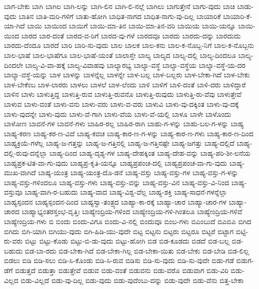 {ಬಾಗ-ಬೇಕು
ಬಾಗಿ
ಬಾಗಿಲ
ಬಾಗಿ-ಲನ್ನು
ಬಾಗಿ-ಲಿನ
ಬಾಗಿ-ಲಿ-ನಲ್ಲೆ
ಬಾಗಿಲು
ಬಾಗುತ್ತೇನೆ
ಬಾಗು-ವುದು
ಬಾಚಿ
ಬಾಡು-ವುದು
ಬಾತಿನ
ಬಾತಿ-ಮರಿ-ಗಳಿಗೆ
ಬಾತು-ಹೋಗಿ
ಬಾಧಿತ-ನಾಗದ
ಬಾಧಿತ-ನಾಗು-ವು-ದಿಲ್ಲ
ಬಾಯಾರಿಕೆ
ಬಾಯಾರಿ-ಕೆ-ಯಾ-ಗಿದೆ
ಬಾಯಿ
ಬಾಯಿಂದ
ಬಾಯಿಗೆ
ಬಾಯಿ-ಮಾ-ತಿನ
ಬಾಯಿ-ಮಾ-ತಿನ-ವರಿ
ಬಾಯಿಯ
ಬಾಯಿ-ಯನ್ನೂ
ಬಾಯಿ-ಯಿಂದ
ಬಾರದ
ಬಾರ-ದಂತೆ
ಬಾರದ-ವ-ರಿಗೆ
ಬಾರದ-ವು-ಗಳೆ
ಬಾರದವೂ
ಬಾರದು
ಬಾರದು-ದನ್ನು
ಬಾರದುದು
ಬಾರದು-ದೆಂದೂ
ಬಾರದೆ
ಬಾರಿ
ಬಾರಿ-ಸು-ವುದು
ಬಾಲ
ಬಾಲಕ
ಬಾಲ-ಕನು
ಬಾಲ-ಕ-ನೊಬ್ಬ-ನಿಗೆ
ಬಾಲ-ಕ-ನೊಬ್ಬನು
ಬಾಲ-ಭಾಷೆ
ಬಾಲ-ಭಾಷೆಗೂ
ಬಾಲ-ಭಾಷೆ-ಯಂತೆ
ಬಾಲಾಸ್ತೇ
ಬಾಲ್ಯ
ಬಾಲ್ಯದ
ಬಾಲ್ಯ-ದಲ್ಲಿ
ಬಾಲ್ಯ-ದಿಂದಲೂ
ಬಾಲ್ಯ-ದಿಂದಲೇ
ಬಾಲ್ಯ-ವಿ-ವಾ-ಹಕ್ಕೆ
ಬಾಲ್ಯ-ವಿವಾಹವು
ಬಾಲ್ಯಾರಭ್ಯ
ಬಾಲ್ಯಾ-ವಸ್ಥೆ
ಬಾಲ್ಯಾ-ವಸ್ಥೆಯ
ಬಾಲ್ಯಾ-ವಸ್ಥೆ-ಯ-ದರ
ಬಾಲ್ಯಾ-ವಸ್ಥೆ-ಯನ್ನು
ಬಾಳ
ಬಾಳನ್ನು
ಬಾಳನ್ನೆಲ್ಲ
ಬಾಳನ್ನೇ
ಬಾಳ-ಬಲ್ಲ
ಬಾಳ-ಬಲ್ಲರು
ಬಾಳ-ಬೇಕಾ-ಗಿದೆ
ಬಾಳ-ಬೇಕು
ಬಾಳ-ಬೇಕೆಂಬ
ಬಾಳ-ಲಾರರು
ಬಾಳಲು
ಬಾಳಲೆ
ಬಾಳ-ಲೆಂದು
ಬಾಳಿ
ಬಾಳಿಗೆ
ಬಾಳಿ-ದಂತೆ
ಬಾಳಿ-ದರು
ಬಾಳಿದ್ದಾರೆ
ಬಾಳಿನ
ಬಾಳು
ಬಾಳುತ್ತಿದ್ದ
ಬಾಳುತ್ತಿ-ರುವ
ಬಾಳುತ್ತಿ-ರುವನೊ
ಬಾಳುತ್ತಿ-ರುವುದು
ಬಾಳುತ್ತಿ-ರು-ವೆವು
ಬಾಳುತ್ತೇವೆ
ಬಾಳುವ
ಬಾಳು-ವಂತೆ
ಬಾಳು-ವನು
ಬಾಳು-ವರು
ಬಾಳು-ವ-ವರು
ಬಾಳುವಿ
ಬಾಳು-ವು-ದಕ್ಕಿಂತ
ಬಾಳು-ವು-ದಕ್ಕೆ
ಬಾಳು-ವುದನ್ನೇ
ಬಾಳು-ವುದು
ಬಾಳು-ವೆ-ಗಾಗಿ
ಬಾಳು-ವೆಯ
ಬಾಳು-ವೆ-ಯಲ್ಲಿ
ಬಾಳೂ
ಬಾಳೇ
ಬಾಳೊಂದು
ಬಾಳೋಣ
ಬಾವನೆ-ಗಳ
ಬಾವನೆ-ಗಳು
ಬಾಹಿರ-ರಲ್ಲ
ಬಾಹಿರ-ರಾಗಿ
ಬಾಹು-ಗ-ಳನ್ನು
ಬಾಹು-ಬಲ-ಗ-ಳನ್ನು
ಬಾಹ್ಯ
ಬಾಹ್ಯ-ಕರಣ
ಬಾಹ್ಯ-ಕರ-ಣ-ವಿದೆ
ಬಾಹ್ಯ-ಕವಚ
ಬಾಹ್ಯ-ಕಾರ-ಣ-ಗ-ಳನ್ನು
ಬಾಹ್ಯ-ಕಾರ-ಣ-ಗಳು
ಬಾಹ್ಯ-ಕಾರ-ಣ-ದಿಂದ
ಬಾಹ್ಯಕ್ರಿಯೆ-ಗಳೆಲ್ಲ
ಬಾಹ್ಯ-ಜ-ಗತ್ತನ್ನು
ಬಾಹ್ಯ-ಜ-ಗತ್ತಿನಲ್ಲಿ
ಬಾಹ್ಯ-ಜ-ಗತ್ತಿನಷ್ಟೇ
ಬಾಹ್ಯ-ಜಗತ್ತು
ಬಾಹ್ಯ-ದಲ್ಲಿದೆ
ಬಾಹ್ಯ-ದಲ್ಲಿ-ರುವು-ದನ್ನೆಲ್ಲಾ
ಬಾಹ್ಯ-ದಿಂದ
ಬಾಹ್ಯ-ದೃಶ್ಯ-ಗಳ
ಬಾಹ್ಯ-ದೇಹಕ್ಕಿಂತ
ಬಾಹ್ಯ-ದೇಹ-ವನ್ನು
ಬಾಹ್ಯ-ಪರಿ-ಶೀ-ಲನೆಯ
ಬಾಹ್ಯಪ್ರಕ-ಟಿತ-ವಾ-ಗು-ವುದು
ಬಾಹ್ಯಪ್ರ-ಕೃತಿ-ಯನ್ನೂ
ಬಾಹ್ಯಪ್ರಪಂಚ-ದಲ್ಲಿ
ಬಾಹ್ಯಪ್ರಪಂಚ-ವಾ-ಗು-ವುದು
ಬಾಹ್ಯ-ಮುಖ-ವಾಗಿದೆ
ಬಾಹ್ಯ-ಯಂತ್ರ
ಬಾಹ್ಯ-ಯಂತ್ರ-ದೊ-ಡನೆ
ಬಾಹ್ಯ-ವಸ್ತು
ಬಾಹ್ಯ-ವಸ್ತು-ಗಳ
ಬಾಹ್ಯ-ವಸ್ತು-ಗ-ಳನ್ನು
ಬಾಹ್ಯ-ವಸ್ತು-ಗಳಿಂದಲೂ
ಬಾಹ್ಯ-ವಸ್ತು-ಗಳು
ಬಾಹ್ಯ-ವಸ್ತು-ವನ್ನು
ಬಾಹ್ಯ-ವಸ್ತು-ವಿನ
ಬಾಹ್ಯ-ವಸ್ತು-ವಿ-ನಿಂದ
ಬಾಹ್ಯ-ವಸ್ತುವೂ
ಬಾಹ್ಯ-ವಾಗಿ-ರ-ಬಹುದು
ಬಾಹ್ಯ-ವಾದ
ಬಾಹ್ಯ-ವಿಶ್ವ-ವೆಲ್ಲ
ಬಾಹ್ಯ-ಶಕ್ತಿ
ಬಾಹ್ಯ-ಸಾಧನೆ-ಗಳನ್ನೆಲ್ಲಾ
ಬಾಹ್ಯಸ್ಪಂದನ
ಬಾಹ್ಯಸ್ಪಂದನ-ದಿಂದ
ಬಾಹ್ಯಸ್ವಾ-ತಂತ್ರ್ಯದ
ಬಾಹ್ಯಾ-ಕಾ-ರಕ್ಕೆ
ಬಾಹ್ಯಾ-ಚಾರ
ಬಾಹ್ಯಾ-ಚಾರ-ಗಳ
ಬಾಹ್ಯಾ-ಚಾರದ
ಬಾಹ್ಯಾಭ್ಯಂತರಸ್ತಂಭ-ವೃತ್ತಿಃ
ಬಾಹ್ಯೇಂದ್ರಿಯ-ಗಳಿಂದ
ಬಾಹ್ಯೇಂದ್ರಿಯ-ಗಳಿ-ಗಿಂತಲೂ
ಬಾಹ್ಯೇಂದ್ರಿಯ-ಗಳಿವೆ
ಬಾಹ್ಯೇಂದ್ರಿಯ-ಗಳು
ಬಿ
ಬಿಂದು
ಬಿಂದು-ವಿಗೂ
ಬಿಂದು-ವಿ-ನಲ್ಲಿ
ಬಿಂದುವೂ
ಬಿಂಬ-ಗಳು
ಬಿಎಂಬುದೆ
ಬಿಎಬಿಎ
ಬಿಗಿದ
ಬಿಗಿದು
ಬಿಗಿ-ಯಾಗಿ
ಬಿಗಿಯು-ವುದು
ಬಿಗಿ-ಹಿಡಿ-ಯು-ವುದೇ
ಬಿಟ್ಟ
ಬಿಟ್ಟನು
ಬಿಟ್ಟರು
ಬಿಟ್ಟರೂ
ಬಿಟ್ಟರೆ
ಬಿಟ್ಟಾಗ
ಬಿಟ್ಟಿ-ರು-ವರು
ಬಿಟ್ಟು
ಬಿಟ್ಟು-ಕೊಡು
ಬಿಟ್ಟು-ಬಿ-ಡು-ವುದು
ಬಿಟ್ಟು-ಹೋಗಿ
ಬಿಡ
ಬಿಡ-ಕೂಡದು
ಬಿಡದೆ
ಬಿಡ-ಬಲ್ಲ
ಬಿಡ-ಬಹುದು
ಬಿಡ-ಬಾ-ರದು
ಬಿಡ-ಬೇಕಾ-ಗಿದೆ
ಬಿಡ-ಬೇಕಾ-ಗಿಲ್ಲ
ಬಿಡ-ಬೇಕಾ-ಯಿತು
ಬಿಡ-ಬೇಕು
ಬಿಡ-ಬೇಡಿ
ಬಿಡ-ಲಿಲ್ಲ
ಬಿಡಲು
ಬಿಡಿ
ಬಿಡಿ-ಸಲು
ಬಿಡಿ-ಸಿ-ಕೊಂಡು
ಬಿಡಿ-ಸಿ-ರುವ
ಬಿಡಿಸು
ಬಿಡಿ-ಸು-ವುದು
ಬಿಡಿ-ಸು-ವುದೇ
ಬಿಡು-ಗಡೆ
ಬಿಡುಗ-ಡೆಗೆ
ಬಿಡುತ್ತದೆ
ಬಿಡುತ್ತಾ
ಬಿಡುತ್ತೇವೆ
ಬಿಡುವ
ಬಿಡು-ವಂತೆ
ಬಿಡುವನು
ಬಿಡು-ವರೊ
ಬಿಡುವಾಗ
ಬಿಡು-ವಿರಿ
ಬಿಡು-ವಿಲ್ಲದ
ಬಿಡು-ವಿಲ್ಲದೆ
ಬಿಡು-ವು-ದಿಲ್ಲ
ಬಿಡು-ವುದು
ಬಿಡು-ವುದೆಂಬು-ದನ್ನು
ಬಿಡು-ವುದೇ
ಬಿಡು-ವೆನು
ಬಿತ್ತ-ಬೇಕಾ
}

